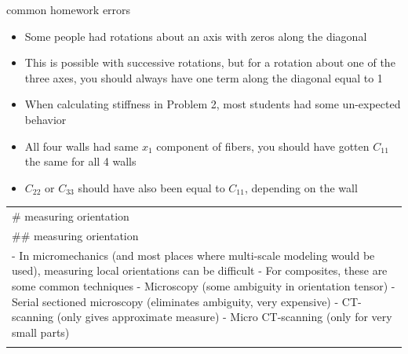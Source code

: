 \documentclass[12pt,handout]{beamer}
\providecommand{\tightlist}{%
  \setlength{\itemsep}{0pt}\setlength{\parskip}{0pt}}
\providecommand{\tightlist}{%
\setlength{\itemsep}{0pt}\setlength{\parskip}{0pt}}
\begin{document}
\begin{frame}{common homework errors}
\protect\hypertarget{common-homework-errors}{}
\begin{itemize}
\tightlist
\item
  Some people had rotations about an axis with zeros along the diagonal
\item
  This is possible with successive rotations, but for a rotation about
  one of the three axes, you should always have one term along the
  diagonal equal to 1
\item
  When calculating stiffness in Problem 2, most students had some
  un-expected behavior
\item
  All four walls had same \(x_1\) component of fibers, you should have
  gotten \(C_{11}\) the same for all 4 walls
\item
  \(C_{22}\) or \(C_{33}\) should have also been equal to \(C_{11}\),
  depending on the wall
\end{itemize}

\begin{longtable}[]{@{}
  >{\raggedright\arraybackslash}p{}@{}}
\toprule
\# measuring orientation \\ \addlinespace
\midrule
\endhead
\#\# measuring orientation \\ \addlinespace
- In micromechanics (and most places where multi-scale modeling would be
used), measuring local orientations can be difficult - For composites,
these are some common techniques - Microscopy (some ambiguity in
orientation tensor) - Serial sectioned microscopy (eliminates ambiguity,
very expensive) - CT-scanning (only gives approximate measure) - Micro
CT-scanning (only for very small parts) \\ \addlinespace
\bottomrule
\end{longtable}
\end{frame}
\end{document}
